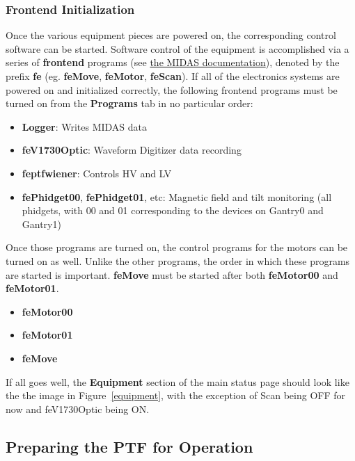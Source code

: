 \documentclass[twoside,letterpaper]{refart}
\begin{document}
\subsubsection{Frontend Initialization}

Once the various equipment pieces are powered on, the corresponding control software can be started. Software control of the equipment is accomplished via a series of \textbf{frontend} programs (see \href{https://midas.triumf.ca/MidasWiki/index.php/Frontend_Application}{the MIDAS documentation}), denoted by the prefix \textbf{fe} (eg. \textbf{feMove}, \textbf{feMotor}, \textbf{feScan}). If all of the electronics systems are powered on and initialized correctly, the following frontend programs must be turned on from the \textbf{Programs} tab in no particular order:

\begin{itemize}
	
	\item \textbf{Logger}: Writes MIDAS data
	\item \textbf{feV1730Optic}: Waveform Digitizer data recording
	\item \textbf{feptfwiener}: Controls HV and LV
	\item \textbf{fePhidget00}, \textbf{fePhidget01}, etc: Magnetic field and tilt monitoring (all phidgets, with 00 and 01 corresponding to the devices on Gantry0 and Gantry1)
	
\end{itemize}

Once those programs are turned on, the control programs for the motors can be turned on as well. Unlike the other programs, the order in which these programs are started is important. \textbf{feMove} must be started after both \textbf{feMotor00} and \textbf{feMotor01}.

\begin{itemize}
	
	\item \textbf{feMotor00}
	\item \textbf{feMotor01}
	\item \textbf{feMove}
	
\end{itemize}

If all goes well, the \textbf{Equipment} section of the main status page should look like the the image in Figure~\ref{equipment}, with the exception of Scan being OFF for now and feV1730Optic being ON.

\subsection{Preparing the PTF for Operation}
\end{document}
